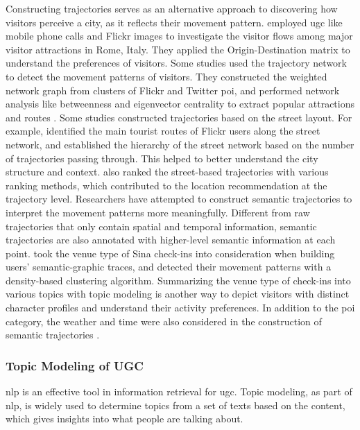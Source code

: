 \documentclass{article}
\begin{document}
Constructing trajectories serves as an alternative approach to discovering how visitors perceive a city, as it reflects their movement pattern. \cite{girardin_digital_2008} employed \acrshort{ugc} like mobile phone calls and Flickr images to investigate the visitor flows among major visitor attractions in Rome, Italy. They applied the Origin-Destination matrix to understand the preferences of visitors. Some studies used the trajectory network to detect the movement patterns of visitors. They constructed the weighted network graph from clusters of Flickr and Twitter \acrshort{poi}, and performed network analysis like betweenness and eigenvector centrality to extract popular attractions and routes \citep{straumann_towards_2014, hu_graph-based_2019}. Some studies constructed trajectories based on the street layout. For example, \cite{mohino_identifying_2018} identified the main tourist routes of Flickr users along the street network, and \cite{domenech_using_2020} established the hierarchy of the street network based on the number of trajectories passing through. This helped to better understand the city structure and context. \cite{yin_diversified_2011} also ranked the street-based trajectories with various ranking methods, which contributed to the location recommendation at the trajectory level. Researchers have attempted to construct semantic trajectories to interpret the movement patterns more meaningfully. Different from raw trajectories that only contain spatial and temporal information, semantic trajectories are also annotated with higher-level semantic information at each point. \cite{wan_semantic-geographic_2017} took the venue type of Sina check-ins into consideration when building users' semantic-graphic traces, and detected their movement patterns with a density-based clustering algorithm. Summarizing the venue type of check-ins into various topics with topic modeling is another way to depict visitors with distinct character profiles and understand their activity preferences. In addition to the \acrshort{poi} category, the weather and time were also considered in the construction of semantic trajectories \cite{cai_mining_2018, liu_stccd_2020}.


\subsubsection{Topic Modeling of UGC}
\acrfull{nlp} is an effective tool in information retrieval for \acrshort{ugc}. Topic modeling, as part of \acrshort{nlp}, is widely used to determine topics from a set of texts based on the content, which gives insights into what people are talking about. 
\end{document}
